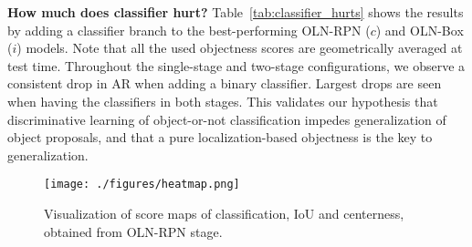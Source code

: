 \documentclass[10pt,twocolumn,letterpaper]{article}
\newcommand{\tableref}[1]{Table~\ref{#1}}
\renewcommand{\paragraph}[1]{\vspace{1mm}\noindent\textbf{#1}}
\begin{document}
\begin{table}[]
\centering
{}
\caption{\small{How much does classifier hurt?} Different OLN configurations on {VOC} $\rightarrow$ {Non-VOC} setting.}
\label{tab:classifier_hurts}
\end{table}




\paragraph{{How much does classifier hurt?}}\quad
\tableref{tab:classifier_hurts} shows the results by adding a classifier branch to the best-performing OLN-RPN ($c$) and OLN-Box ($i$) models. Note that all the used objectness scores are geometrically averaged at test time. Throughout the single-stage and two-stage configurations, we observe a consistent drop in AR when adding a binary classifier. Largest drops are seen when having the classifiers in both stages. This validates our hypothesis that discriminative learning of object-or-not classification impedes generalization of object proposals, and that a pure localization-based objectness is the key to generalization.

\begin{figure}
\centering
\texttt{[image: ./figures/heatmap.png]}
\vspace{-4mm}
\caption{\small{Visualization of score maps of classification, IoU and centerness, obtained from OLN-RPN stage.}}
\label{fig:heatmap}
\end{figure}
\end{document}

